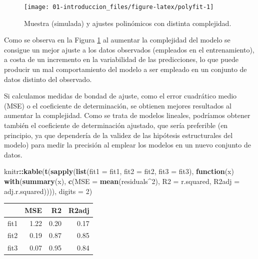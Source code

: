 \documentclass[]{book}
\newenvironment{Shaded}{\begin{snugshade}}{\end{snugshade}}
\newcommand{\KeywordTok}[1]{\textcolor[rgb]{0.13,0.29,0.53}{\textbf{#1}}}
\newcommand{\DataTypeTok}[1]{\textcolor[rgb]{0.13,0.29,0.53}{#1}}
\newcommand{\DecValTok}[1]{\textcolor[rgb]{0.00,0.00,0.81}{#1}}
\newcommand{\ControlFlowTok}[1]{\textcolor[rgb]{0.13,0.29,0.53}{\textbf{#1}}}
\newcommand{\OperatorTok}[1]{\textcolor[rgb]{0.81,0.36,0.00}{\textbf{#1}}}
\newcommand{\NormalTok}[1]{#1}
\theoremstyle{break}
\theoremstyle{definition}
\theoremstyle{definition}
\theoremstyle{definition}
\theoremstyle{remark}
\begin{document}
\begin{figure}[!htb]

{\centering \texttt{[image: 01-introduccion\_files/figure-latex/polyfit-1]} 

}

\caption{Muestra (simulada) y ajustes polinómicos con distinta complejidad.}\label{fig:polyfit}
\end{figure}

Como se observa en la Figura \ref{fig:polyfit} al aumentar la
complejidad del modelo se consigue un mejor ajuste a los datos
observados (empleados en el entrenamiento), a costa de un incremento en
la variabilidad de las predicciones, lo que puede producir un mal
comportamiento del modelo a ser empleado en un conjunto de datos
distinto del observado.

Si calculamos medidas de bondad de ajuste, como el error cuadrático
medio (MSE) o el coeficiente de determinación, se obtienen mejores
resultados al aumentar la complejidad. Como se trata de modelos
lineales, podríamos obtener también el coeficiente de determinación
ajustado, que sería preferible (en principio, ya que dependería de la
validez de las hipótesis estructurales del modelo) para medir la
precisión al emplear los modelos en un nuevo conjunto de datos.

\begin{Shaded}
\begin{Highlighting}[]
\NormalTok{knitr}\OperatorTok{::}\KeywordTok{kable}\NormalTok{(}\KeywordTok{t}\NormalTok{(}\KeywordTok{sapply}\NormalTok{(}\KeywordTok{list}\NormalTok{(}\DataTypeTok{fit1 =}\NormalTok{ fit1, }\DataTypeTok{fit2 =}\NormalTok{ fit2, }\DataTypeTok{fit3 =}\NormalTok{ fit3), }
       \ControlFlowTok{function}\NormalTok{(x) }\KeywordTok{with}\NormalTok{(}\KeywordTok{summary}\NormalTok{(x), }
                        \KeywordTok{c}\NormalTok{(}\DataTypeTok{MSE =} \KeywordTok{mean}\NormalTok{(residuals}\OperatorTok{^}\DecValTok{2}\NormalTok{), }\DataTypeTok{R2 =}\NormalTok{ r.squared, }\DataTypeTok{R2adj =}\NormalTok{ adj.r.squared)))), }\DataTypeTok{digits =} \DecValTok{2}\NormalTok{)}
\end{Highlighting}
\end{Shaded}

\begin{tabular}{l|r|r|r}
\hline
  & MSE & R2 & R2adj\\
\hline
fit1 & 1.22 & 0.20 & 0.17\\
\hline
fit2 & 0.19 & 0.87 & 0.85\\
\hline
fit3 & 0.07 & 0.95 & 0.84\\
\hline
\end{tabular}
\end{document}
